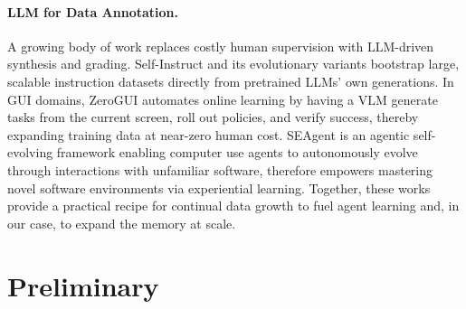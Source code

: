 \documentclass{article} %
\begin{document}
\paragraph{LLM for Data Annotation.}
A growing body of work replaces costly human supervision with LLM-driven synthesis and grading. 
Self-Instruct \citep{wang-etal-2023-self-instruct} and its evolutionary variants \citep{zeng-etal-2024-automatic, xu2024wizardlm} bootstrap large, scalable instruction datasets directly from pretrained LLMs’ own generations.
In GUI domains, ZeroGUI \citep{ZeroGUI} automates online learning by having a VLM generate tasks from the current screen, roll out policies, and verify success, thereby expanding training data at near-zero human cost. SEAgent \citep{SEAgent} is an agentic self-evolving framework enabling computer use agents to autonomously evolve through interactions with unfamiliar software, therefore empowers mastering novel software environments via experiential learning. 
Together, these works provide a practical recipe for continual data growth to fuel agent learning and, in our case, to expand the memory at scale.


\section{Preliminary}
\label{sec:prelim}
\end{document}
